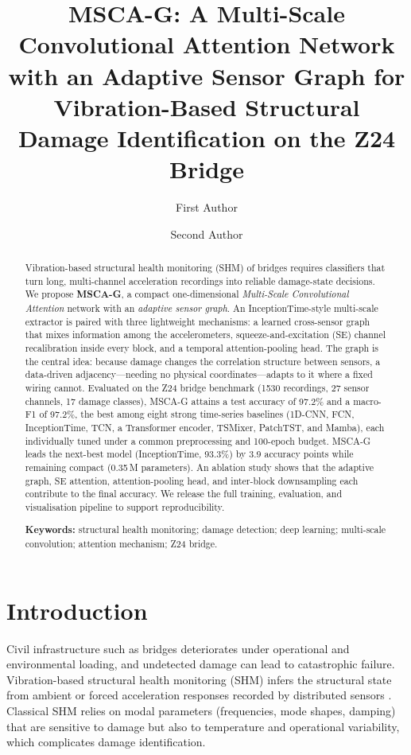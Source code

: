 \documentclass[11pt]{article}
\title{\bfseries MSCA-G: A Multi-Scale Convolutional Attention Network with an
Adaptive Sensor Graph for Vibration-Based Structural Damage Identification on the
Z24 Bridge}
\author[1]{First Author}
\author[1]{Second Author}
\affil[1]{Affiliation, City, Country. \texttt{corresponding@email}}
\date{}
\newcommand{\result}[1]{#1}
\begin{document}
\maketitle

\begin{abstract}
\noindent
Vibration-based structural health monitoring (SHM) of bridges requires
classifiers that turn long, multi-channel acceleration recordings into reliable
damage-state decisions. We propose \textbf{MSCA-G}, a compact one-dimensional
\emph{Multi-Scale Convolutional Attention} network with an \emph{adaptive sensor
graph}. An InceptionTime-style multi-scale extractor is paired with three
lightweight mechanisms: a learned cross-sensor graph that mixes information among
the accelerometers, squeeze-and-excitation (SE) channel recalibration inside
every block, and a temporal attention-pooling head. The graph is the central
idea: because damage changes the correlation structure between sensors, a
data-driven adjacency---needing no physical coordinates---adapts to it where a
fixed wiring cannot. Evaluated on the Z24 bridge benchmark (\num{1530}
recordings, \num{27} sensor channels, \num{17} damage classes), MSCA-G attains a
test accuracy of \result{97.2}\% and a macro-F1 of \result{97.2}\%, the best among
eight strong time-series baselines (1D-CNN, FCN, InceptionTime, TCN, a Transformer
encoder, TSMixer, PatchTST, and Mamba), each individually tuned under a common
preprocessing and \num{100}-epoch budget. MSCA-G leads the next-best model
(InceptionTime, \result{93.3}\%) by \result{3.9} accuracy points while remaining
compact (\result{0.35}\,M parameters). An ablation study shows that the adaptive
graph, SE attention, attention-pooling head, and inter-block downsampling each
contribute to the final accuracy. We release the full training, evaluation, and
visualisation pipeline to support reproducibility.

\vspace{0.5em}
\noindent\textbf{Keywords:} structural health monitoring; damage detection;
deep learning; multi-scale convolution; attention mechanism; Z24 bridge.
\end{abstract}

\section{Introduction}
\label{sec:intro}
Civil infrastructure such as bridges deteriorates under operational and
environmental loading, and undetected damage can lead to catastrophic failure.
Vibration-based structural health monitoring (SHM) infers the structural state
from ambient or forced acceleration responses recorded by distributed sensors
\cite{farrar2012structural}. Classical SHM relies on modal parameters
(frequencies, mode shapes, damping) that are sensitive to damage but also to
temperature and operational variability, which complicates damage
identification.
\end{document}
